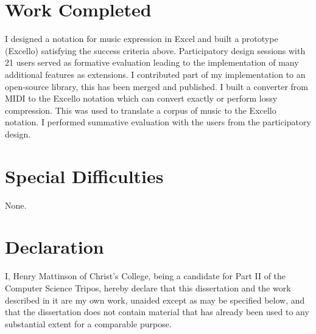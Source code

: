 \documentclass[12pt,a4paper,twoside,openright]{report}
\begin{document}
\section*{Work Completed}

I designed a notation for music expression in Excel and built a prototype (Excello) satisfying the success criteria above. Participatory design sessions with 21 users served as formative evaluation leading to the implementation of many additional features as extensions. I contributed part of my implementation to an open-source library, this has been merged and published. I built a converter from MIDI to the Excello notation which can convert exactly or perform lossy compression. This was used to translate a corpus of music to the Excello notation. I performed summative evaluation with the users from the participatory design.

\section*{Special Difficulties}

None.

\newpage
\section*{Declaration}

I, Henry Mattinson of Christ's College, being a candidate for Part II of the Computer
Science Tripos, hereby declare
that this dissertation and the work described in it are my own work,
unaided except as may be specified below, and that the dissertation
does not contain material that has already been used to any substantial
extent for a comparable purpose.

\bigskip
{}

\medskip
{}

\tableofcontents





\pagestyle{headings}


\end{document}
